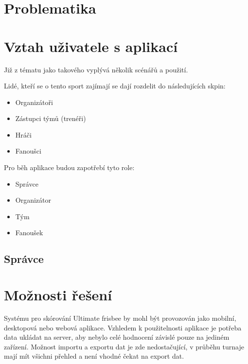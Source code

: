 \documentclass[thesis=B,czech]{FITthesis}[2012/06/26]
\begin{document}
	\section{Problematika}


	\section{Vztah uživatele s aplikací}
	Již z tématu jako takového vyplývá několik scénářů a použití.

	Lidé, kteří se o tento sport zajímají se dají rozdelit do následujících skpin:
	\begin{itemize}
		\item Organizátoři
		\item Zástupci týmů (trenéři)
		\item Hráči
		\item Fanoušci
	\end{itemize}

	Pro běh aplikace budou zapotřebí tyto role:
	\begin{itemize}
		\item Správce
		\item Organizátor
		\item Tým
		\item Fanoušek
	\end{itemize}

	\subsection{Správce}




	\section{Možnosti řešení}
	Systému pro skórování Ultimate frisbee by mohl být provozován jako mobilní, desktopová nebo webová aplikace. Vzhledem k použitelnosti aplikace je potřeba data ukládat na server, aby nebylo celé hodnocení závislé pouze na jediném zařízení. Možnost importu a exportu dat je zde nedostačující, v průběhu turnaje mají mít všichni přehled a není vhodné čekat na export dat.
	
\end{document}
